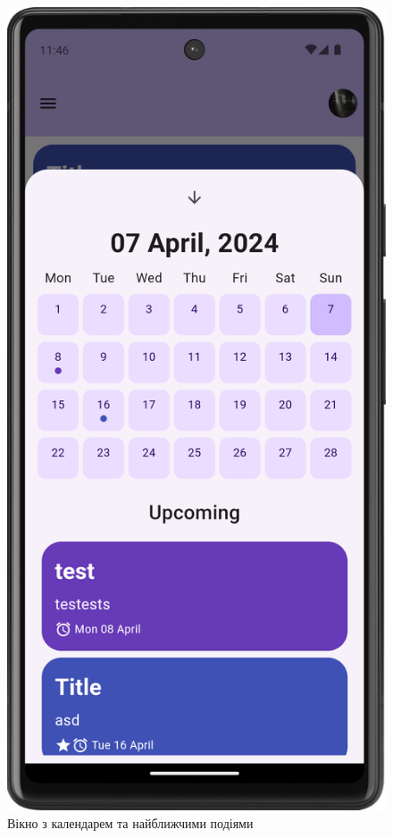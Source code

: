 \documentclass[oneside,14pt]{extarticle}
\begin{document}
\begin{normalsize}
\begin{figure}[H]
		\begin{minipage}{0.48\textwidth}
			\centering
			\includegraphics[scale=0.12]{2}
			\caption{Вікно з календарем та найближчими подіями}
		\end{minipage}
	\end{figure}
	

\end{normalsize}
\end{document}
